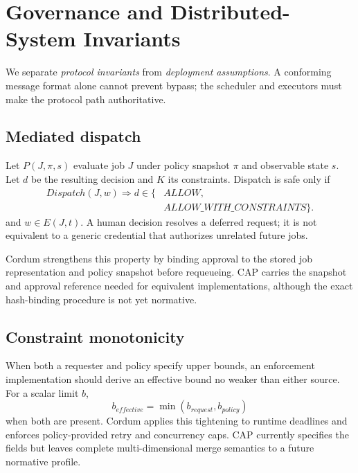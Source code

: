 \section{Governance and Distributed-System Invariants}

We separate \emph{protocol invariants} from \emph{deployment assumptions}. A conforming message format alone cannot prevent bypass; the scheduler and executors must make the protocol path authoritative.

\subsection{Mediated dispatch}

Let $P(J,\pi,s)$ evaluate job $J$ under policy snapshot $\pi$ and observable state $s$. Let $d$ be the resulting decision and $K$ its constraints. Dispatch is safe only if
\begin{equation}
\begin{aligned}
Dispatch(J,w) \Rightarrow d \in \{&ALLOW,\\
&ALLOW\_WITH\_CONSTRAINTS\}.
\end{aligned}
\end{equation}
and $w \in E(J,t)$. A human decision resolves a deferred request; it is not equivalent to a generic credential that authorizes unrelated future jobs.

Cordum strengthens this property by binding approval to the stored job representation and policy snapshot before requeueing. CAP carries the snapshot and approval reference needed for equivalent implementations, although the exact hash-binding procedure is not yet normative.

\subsection{Constraint monotonicity}

When both a requester and policy specify upper bounds, an enforcement implementation should derive an effective bound no weaker than either source. For a scalar limit $b$,
\begin{equation}
  b_{effective} = \min(b_{request}, b_{policy})
\end{equation}
when both are present. Cordum applies this tightening to runtime deadlines and enforces policy-provided retry and concurrency caps. CAP currently specifies the fields but leaves complete multi-dimensional merge semantics to a future normative profile.

